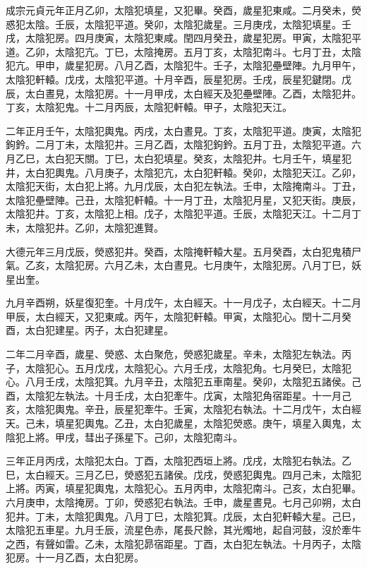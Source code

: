 \begin{pinyinscope}
 成宗元貞元年正月乙卯，太陰犯填星，又犯畢。癸酉，歲星犯東咸。二月癸未，熒惑犯太陰。壬辰，太陰犯平道。癸卯，太陰犯歲星。三月庚戌，太陰犯填星。壬戌，太陰犯房。四月庚寅，太陰犯東咸。閏四月癸丑，歲星犯房。甲寅，太陰犯平道。乙卯，太陰犯亢。丁巳，太陰掩房。五月丁亥，太陰犯南斗。七月丁丑，太陰犯亢。甲申，歲星犯房。八月乙酉，太陰犯牛。壬子，太陰犯壘壁陣。九月甲午，太陰犯軒轅。戊戌，太陰犯平道。十月辛酉，辰星犯房。壬戌，辰星犯鍵閉。戊辰，太白晝見，太陰犯房。十一月甲戌，太白經天及犯壘壁陣。乙酉，太陰犯井。丁亥，太陰犯鬼。十二月丙辰，太陰犯軒轅。甲子，太陰犯天江。



 二年正月壬午，太陰犯輿鬼。丙戌，太白晝見。丁亥，太陰犯平道。庚寅，太陰犯鉤鈐。二月丁未，太陰犯井。三月乙酉，太陰犯鉤鈐。五月丁丑，太陰犯平道。六月乙巳，太白犯天關。丁巳，太白犯填星。癸亥，太陰犯井。七月壬午，填星犯井，太白犯輿鬼。八月庚子，太陰犯亢，太白犯軒轅。癸卯，太陰犯天江。乙卯，太陰犯天街，太白犯上將。九月戊辰，太白犯左執法。壬申，太陰掩南斗。丁丑，太陰犯壘壁陣。己丑，太陰犯軒轅。十一月丁丑，太陰犯月星，又犯天街。庚辰，太陰犯井。丁亥，太陰犯上相。戊子，太陰犯平道。壬辰，太陰犯天江。十二月丁未，太陰犯井。乙卯，太陰犯進賢。



 大德元年三月戊辰，熒惑犯井。癸酉，太陰掩軒轅大星。五月癸酉，太白犯鬼積尸氣。乙亥，太陰犯房。六月乙未，太白晝見。七月庚午，太陰犯房。八月丁巳，妖星出奎。



 九月辛酉朔，妖星復犯奎。十月戊午，太白經天。十一月戊子，太白經天。十二月甲辰，太白經天，又犯東咸。丙午，太陰犯軒轅。甲寅，太陰犯心。閏十二月癸酉，太白犯建星。丙子，太白犯建星。



 二年二月辛酉，歲星、熒惑、太白聚危，熒惑犯歲星。辛未，太陰犯左執法。丙子，太陰犯心。五月戊戌，太陰犯心。六月壬戌，太陰犯角。七月癸巳，太陰犯心。八月壬戌，太陰犯箕。九月辛丑，太陰犯五車南星。癸卯，太陰犯五諸侯。己酉，太陰犯左執法。十月壬戌，太白犯牽牛。戊寅，太陰犯角宿距星。十一月己亥，太陰犯輿鬼。辛丑，辰星犯牽牛。壬寅，太陰犯右執法。十二月戊午，太白經天。己未，填星犯輿鬼。乙丑，太白犯歲星，太陰犯熒惑。庚午，填星入輿鬼，太陰犯上將。甲戌，彗出子孫星下。己卯，太陰犯南斗。



 三年正月丙戌，太陰犯太白。丁酉，太陰犯西垣上將。戊戌，太陰犯右執法。乙巳，太白經天。三月乙巳，熒惑犯五諸侯。戊戌，熒惑犯輿鬼。四月己未，太陰犯上將。丙寅，填星犯輿鬼，太陰犯心。五月丙申，太陰犯南斗。己亥，太白犯畢。六月庚申，太陰掩房。丁卯，熒惑犯右執法。壬申，歲星晝見。七月己卯朔，太白犯井。丁未，太陰犯輿鬼。八月丁巳，太陰犯箕。戊辰，太白犯軒轅大星。己巳，太陰犯五車星。九月壬辰，流星色赤，尾長尺餘，其光燭地，起自河鼓，沒於牽牛之西，有聲如雷。乙未，太陰犯昴宿距星。丁酉，太白犯左執法。十月丙子，太陰犯房。十一月乙酉，太白犯房。




\end{pinyinscope}
